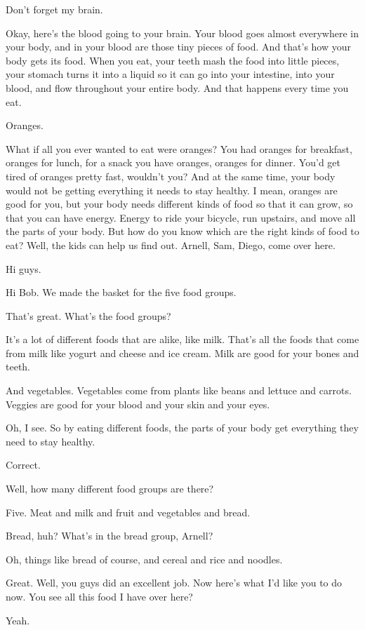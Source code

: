 Don't forget my brain.

Okay, here's the blood going to your brain. Your blood goes almost everywhere in your body, and in your blood are those tiny pieces of food. And that's how your body gets its food. When you eat, your teeth mash the food into little pieces, your stomach turns it into a liquid so it can go into your intestine, into your blood, and flow throughout your entire body. And that happens every time you eat.

Oranges.

What if all you ever wanted to eat were oranges? You had oranges for breakfast, oranges for lunch, for a snack you have oranges, oranges for dinner. You'd get tired of oranges pretty fast, wouldn't you? And at the same time, your body would not be getting everything it needs to stay healthy. I mean, oranges are good for you, but your body needs different kinds of food so that it can grow, so that you can have energy. Energy to ride your bicycle, run upstairs, and move all the parts of your body. But how do you know which are the right kinds of food to eat? Well, the kids can help us find out. Arnell, Sam, Diego, come over here.

Hi guys.

Hi Bob. We made the basket for the five food groups.

That's great. What's the food groups?

It's a lot of different foods that are alike, like milk. That's all the foods that come from milk like yogurt and cheese and ice cream. Milk are good for your bones and teeth.

And vegetables. Vegetables come from plants like beans and lettuce and carrots. Veggies are good for your blood and your skin and your eyes.

Oh, I see. So by eating different foods, the parts of your body get everything they need to stay healthy.

Correct.

Well, how many different food groups are there?

Five. Meat and milk and fruit and vegetables and bread.

Bread, huh? What's in the bread group, Arnell?

Oh, things like bread of course, and cereal and rice and noodles.

Great. Well, you guys did an excellent job. Now here's what I'd like you to do now. You see all this food I have over here?

Yeah.

